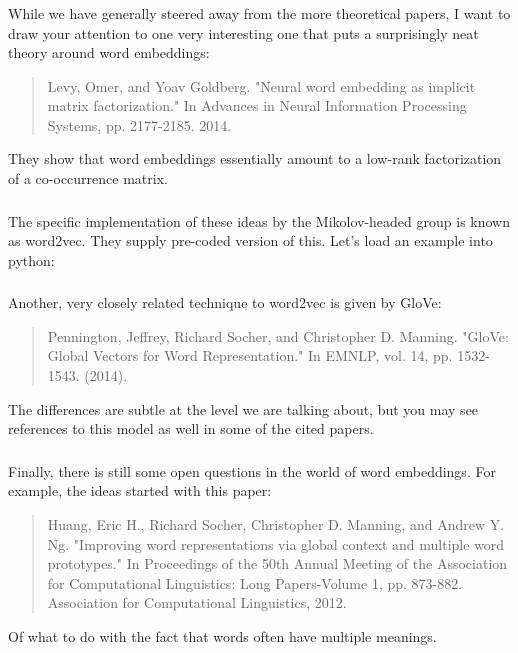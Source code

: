 \documentclass[xetex,mathserif,serif,aspectratio=169]{beamer}
\begin{document}
\begin{frame}[fragile] \frametitle{} \oldB \small

While we have generally steered away from the more theoretical
papers, I want to draw your attention to one very interesting
one that puts a surprisingly neat theory around word embeddings:
\begin{quote}
Levy, Omer, and Yoav Goldberg. "Neural word embedding as
implicit matrix factorization." In Advances in Neural
Information Processing Systems, pp. 2177-2185. 2014.
\end{quote}
They show that word embeddings essentially amount to a low-rank
factorization of a co-occurrence matrix.

\end{frame}

\begin{frame}[fragile] \frametitle{} \oldB \small

The specific implementation of these ideas by the Mikolov-headed
group is known as word2vec. They supply pre-coded version of this.
Let's load an example into python:


\end{frame}

\begin{frame}[fragile] \frametitle{} \oldB \small

Another, very closely related technique to word2vec is given
by GloVe:
\begin{quote}
Pennington, Jeffrey, Richard Socher, and Christopher D. Manning.
"GloVe: Global Vectors for Word Representation."
In EMNLP, vol. 14, pp. 1532-1543. (2014).
\end{quote}
The differences are subtle at the level we are talking about,
but you may see references to this model as well in some of the
cited papers.

\end{frame}

\begin{frame}[fragile] \frametitle{} \oldB \small

Finally, there is still some open questions in the world of
word embeddings. For example, the ideas started with this
paper:
\begin{quote}
Huang, Eric H., Richard Socher, Christopher D. Manning, and
Andrew Y. Ng. "Improving word representations via global
context and multiple word prototypes." In Proceedings of the
50th Annual Meeting of the Association for
Computational Linguistics: Long Papers-Volume 1, pp. 873-882.
Association for Computational Linguistics, 2012.
\end{quote}
Of what to do with the fact that words often have multiple
meanings.

\end{frame}
\end{document}
